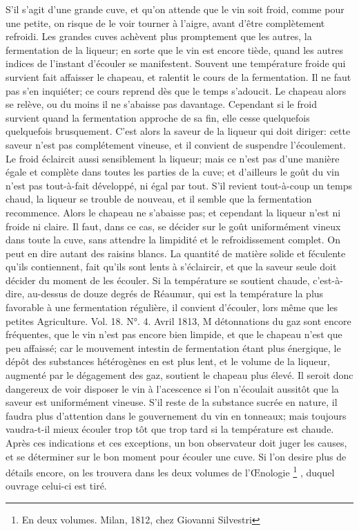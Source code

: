 S'il s'agit d'une grande cuve, et qu'on attende que le vin soit froid, comme pour une petite, on risque de le voir tourner à l'aigre, avant d'être complètement refroidi.
Les grandes cuves achèvent plus promptement que les autres, la fermentation de la liqueur; en sorte que le vin est encore tiède, quand les autres indices de l'instant d'écouler se manifestent.
Souvent une température froide qui survient fait affaisser le chapeau, et ralentit le cours de la fermentation. Il ne faut pas s'en inquiéter; ce cours reprend dès que le temps s'adoucit. Le chapeau alors se relève, ou du moins il ne s'abaisse pas davantage. Cependant si le froid survient quand la fermentation approche de sa fin, elle cesse quelquefois\setcounter{page}{150} quelquefois brusquement. C'est alors la saveur de la liqueur qui doit diriger: cette saveur n'est pas complétement vineuse, et il convient de suspendre l'écoulement.
Le froid éclaircit aussi sensiblement la liqueur; mais ce n'est pas d'une manière égale et complète dans toutes les parties de la cuve; et d'ailleurs le goût du vin n'est pas tout-à-fait développé, ni égal par tout.
S'il revient tout-à-coup un temps chaud, la liqueur se trouble de nouveau, et il semble que la fermentation recommence. Alors le chapeau ne s'abaisse pas; et cependant la liqueur n'est ni froide ni claire. Il faut, dans ce cas, se décider sur le goût uniformément vineux dans toute la cuve, sans attendre la limpidité et le refroidissement complet.
On peut en dire autant des raisins blancs. La quantité de matière solide et féculente qu'ils contiennent, fait qu'ils sont lents à s'éclaircir, et que la saveur seule doit décider du moment de les écouler.
Si la température se soutient chaude, c'est-à-dire, au-dessus de douze degrés de Réaumur, qui est la température la plus favorable à une fermentation régulière, il convient d'écouler, lors même que les petites
Agriculture. Vol. 18. N°. 4. Avril 1813, M\setcounter{page}{151} détonnations du gaz sont encore fréquentes, que le vin n'est pas encore bien limpide, et que le chapeau n'est que peu affaissé; car le mouvement intestin de fermentation étant plus énergique, le dépôt des substances hétérogènes en est plus lent, et le volume de la liqueur, augmenté par le dégagement des gaz, soutient le chapeau plus élevé. Il seroit donc dangereux de voir disposer le vin à l'acescence si l'on n'écoulait aussitôt que la saveur est uniformément vineuse. S'il reste de la substance sucrée en nature, il faudra plus d'attention dans le gouvernement du vin en tonneaux; mais toujours vaudra-t-il mieux écouler trop tôt que trop tard si la température est chaude. Après ces indications et ces exceptions, un bon observateur doit juger les causes, et se déterminer sur le bon moment pour écouler une cuve. Si l'on desire plus de détails encore, on les trouvera dans les deux volumes de l'Œnologie \footnote{En deux volumes. Milan, 1812, chez Giovanni Silvestri} , duquel ouvrage celui-ci est tiré.
